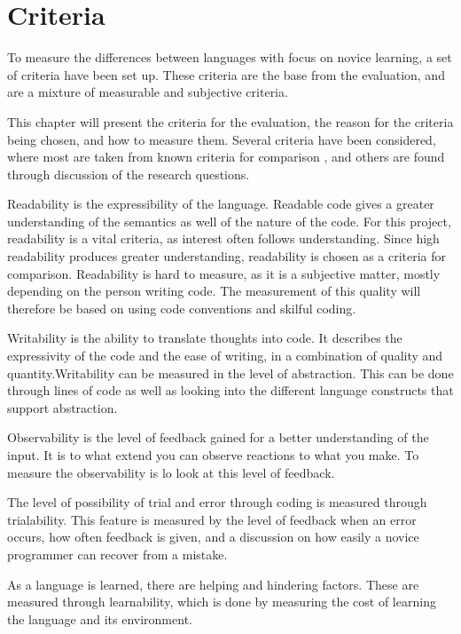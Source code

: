 \chapter{Criteria}
\label{chap:criteria}
To measure the differences between languages with focus on novice learning, a set of criteria have been set up. These criteria are the base from the evaluation, and are a mixture of measurable and subjective criteria.

This chapter will present the criteria for the evaluation, the reason for the criteria being chosen, and how to measure them. Several criteria have been considered, where most are taken from known criteria for comparison \cite{design_criteria1} \cite{design_criteria2}, and others are found through discussion of the research questions.

\begin{description}[style=nextline]
\item[Readability] Readability is the expressibility of the language. Readable code gives a greater understanding of the semantics as well of the nature of the code. For this project, readability is a vital criteria, as interest often follows understanding. Since high readability produces greater understanding, readability is chosen as a criteria for comparison. Readability is hard to measure, as it is a subjective matter, mostly depending on the person writing code. The measurement of this quality will therefore be based on using code conventions and skilful coding.
\item[Writability] Writability is the ability to translate thoughts into code. It describes the expressivity of the code and the ease of writing, in a combination of quality and quantity.Writability can be measured in the level of abstraction. This can be done through lines of code as well as looking into the different language constructs that support abstraction.
\item[Observability] Observability is the level of feedback gained for a better understanding of the input. It is to what extend you can observe reactions to what you make. To measure the observability is lo look at this level of feedback.
\item[Trialability] The level of possibility of trial and error through coding is measured through trialability. This feature is measured by the level of feedback when an error occurs, how often feedback is given, and a discussion on how easily a novice programmer can recover from a mistake.
\item[Learnability] As a language is learned, there are helping and hindering factors. These are measured through learnability, which is done by measuring the cost of learning the language and its environment.

\end{description}
